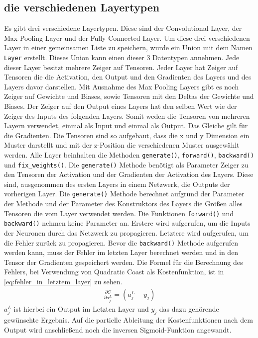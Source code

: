 \documentclass[../main.tex]{subfiles}
\begin{document}
\subsection{die verschiedenen Layertypen}
Es gibt drei verschiedene Layertypen. Diese sind der Convolutional Layer, der Max Pooling Layer und der Fully Connected Layer. Um diese drei verschiedenen Layer in einer gemeinsamen Liste zu speichern, wurde ein Union mit dem Namen \texttt{Layer} erstellt. Dieses Union kann einen dieser 3 Datentypen annehmen. 
Jede dieser Layer besitzt mehrere Zeiger auf Tensoren. Jeder Layer hat Zeiger auf Tensoren die die Activation, den Output und den Gradienten des Layers und des Layers davor darstellen. Mit Ausnahme des Max Pooling Layers gibt es noch Zeiger auf Gewichte und Biases, sowie Tensoren mit den Deltas der Gewichte und Biases. Der Zeiger auf den Output eines Layers hat den selben Wert wie der Zeiger des Inputs des folgenden Layers. Somit weden die Tensoren von mehreren Layern verwendet, einmal als Input und einmal als Output. Das Gleiche gilt für die Gradienten. Die Tensoren sind so aufgebaut, dass die x und y Dimension ein Muster darstellt und mit der z-Position die verschiedenen Muster ausgewählt werden.
Alle Layer beinhalten die Methoden \texttt{generate()}, \texttt{forward()}, \texttt{backward()} und \texttt{fix\_weights()}.
 Die \texttt{generate()} Methode benötigt als Parameter Zeiger zu den Tensoren der Activation und der Gradienten der Activation des Layers. Diese sind, ausgenommen des ersten Layers in einem Netzwerk, die Outputs der vorherigen Layer. Die \texttt{generate()} Methode berechnet aufgrund der Parameter der Methode und der Parameter des Konstruktors des Layers die Größen alles Tensoren die vom Layer verwendet werden.
Die Funktionen \texttt{forward()} und \texttt{backward()} nehmen keine Parameter an. Erstere wird aufgerufen, um die Inputs der Neuronen durch das Netzwerk zu propagieren. Letztere wird aufgerufen, um die Fehler zurück zu propagieren. 
Bevor die \texttt{backward()} Methode aufgerufen werden kann, muss der Fehler im letzten Layer berechnet werden und in den Tensor der Gradienten gespeichert werden. Die Formel für die Berechnung des Fehlers, bei Verwendung von Quadratic Coast als Kostenfunktion, ist in \ref{eq:fehler_in_letztem_layer} zu sehen.
\begin{equation}\label{eq:fehler_in_letztem_layer}
\begin{split}
\frac{\partial C}{\partial a_j^L} = ( a_j^L - y_j )
\end{split}
\end{equation}
$a_j^L$ ist hierbei ein Output im Letzten Layer und $y_j$ das dazu gehörende gewünschte Ergebnis. Auf die partielle Ableitung der Kostenfunktionen nach dem Output wird anschließend noch die inversen Sigmoid-Funktion angewandt.
\end{document}
